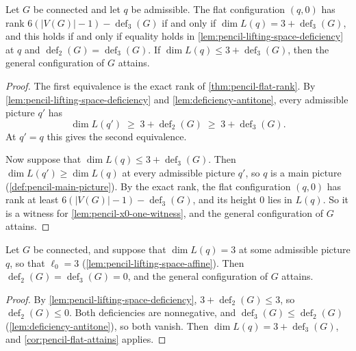 \begin{corollary}
  \label{cor:pencil-flat-attains}
  \leanok
  Let $G$ be connected and let $q$ be admissible. The flat configuration
  $(q, 0)$ has rank $6(|V(G)| - 1) - \operatorname{def}_3(G)$ if and only
  if $\dim L(q) = 3 + \operatorname{def}_3(G)$, and this holds if and
  only if equality holds in \cref{lem:pencil-lifting-space-deficiency} at
  $q$ and $\operatorname{def}_2(G) = \operatorname{def}_3(G)$. If
  $\dim L(q) \le 3 + \operatorname{def}_3(G)$, then the general
  configuration of $G$ attains.
\end{corollary}
\begin{proof}
  \leanok
  The first equivalence is the exact rank of \cref{thm:pencil-flat-rank}.
  By \cref{lem:pencil-lifting-space-deficiency} and
  \cref{lem:deficiency-antitone}, every admissible picture $q'$ has
  \[
    \dim L(q') \;\ge\; 3 + \operatorname{def}_2(G) \;\ge\;
    3 + \operatorname{def}_3(G).
  \]
  At $q' = q$ this gives the second equivalence.

  Now suppose that $\dim L(q) \le 3 + \operatorname{def}_3(G)$. Then
  $\dim L(q') \ge \dim L(q)$ at every admissible picture $q'$, so $q$ is
  a main picture (\cref{def:pencil-main-picture}). By the exact rank, the
  flat configuration $(q, 0)$ has rank at least
  $6(|V(G)| - 1) - \operatorname{def}_3(G)$, and its height $0$ lies in
  $L(q)$. So it is a witness for \cref{lem:pencil-x0-one-witness}, and
  the general configuration of $G$ attains.
\end{proof}

\begin{corollary}
  \label{cor:pencil-flat-x0}
  \leanok
  Let $G$ be connected, and suppose that $\dim L(q) = 3$ at some
  admissible picture $q$, so that $\ell_0 = 3$
  (\cref{lem:pencil-lifting-space-affine}). Then
  $\operatorname{def}_2(G) = \operatorname{def}_3(G) = 0$, and the
  general configuration of $G$ attains.
\end{corollary}
\begin{proof}
  \leanok
  By \cref{lem:pencil-lifting-space-deficiency},
  $3 + \operatorname{def}_2(G) \le 3$, so
  $\operatorname{def}_2(G) \le 0$. Both deficiencies are nonnegative,
  and $\operatorname{def}_3(G) \le \operatorname{def}_2(G)$
  (\cref{lem:deficiency-antitone}), so both vanish. Then
  $\dim L(q) = 3 + \operatorname{def}_3(G)$, and
  \cref{cor:pencil-flat-attains} applies.
\end{proof}

